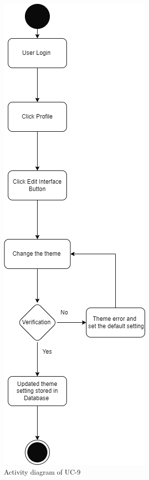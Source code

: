 \begin{figure}[H]
    \centering
    \includegraphics[scale=0.7]{./diagrams/Activity Diagram/ad-09.png}
    \caption{Activity diagram of UC-9}
    \label{fig:act-09}

\end{figure}


